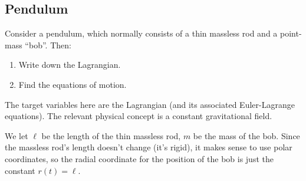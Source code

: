 \subsection{Pendulum}

Consider a pendulum, which normally consists of a thin massless rod and
a point-mass ``bob''. Then:
\begin{enumerate}
\item Write down the Lagrangian.
\item Find the equations of motion.
\end{enumerate}

The target variables here are the Lagrangian (and its associated
Euler-Lagrange equations). The relevant physical concept is a constant
gravitational field.

We let $\ell$ be the length of the thin massless rod, $m$ be the mass of
the bob. Since the massless rod's length doesn't change (it's rigid), it
makes sense to use polar coordinates, so the radial coordinate for the
position of the bob is just the constant $r(t)=\ell$.

